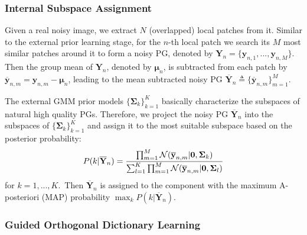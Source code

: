 \documentclass[10pt,twocolumn,letterpaper]{article}
\begin{document}
\vspace{-2mm}
\subsubsection{Internal Subspace Assignment}
\vspace{-1mm}

Given a real noisy image, we extract $N$ (overlapped) local patches from it. Similar to the external prior learning stage, for the $n$-th local patch we search its $M$ most similar patches around it to form a noisy PG, denoted by $\mathbf{Y}_{n} = \{\mathbf{y}_{n,1},...,\mathbf{y}_{n,M}\}$. Then the group mean of $\mathbf{Y}_{n}$, denoted by $\bm{\mu}_{n}$, is subtracted from each patch by $\mathbf{\overline{y}}_{n,m}=\mathbf{y}_{n,m}-\bm{\mu}_{n}$, leading to the mean subtracted noisy PG $\mathbf{\overline{Y}}_{n}\triangleq \{\mathbf{\overline{y}}_{n,m}\}_{m=1}^{M}$.

The external GMM prior models $\{\mathbf{\Sigma}_{k}\}_{k=1}^{K}$ basically characterize the subspaces of natural high quality PGs. Therefore, we project the noisy PG $\mathbf{\overline{Y}}_{n}$ into the subspaces of $\{\mathbf{\Sigma}_{k}\}_{k=1}^{K}$ and assign it to the most suitable subspace based on the posterior probability:
\vspace{-2mm}
\begin{equation}\label{equ3}\vspace{-2mm}
P(k|\mathbf{\overline{Y}}_{n})=\frac{\prod_{m=1}^{M}\mathcal{N}(\mathbf{\overline{y}}_{n,m}|\mathbf{0},\mathbf{\Sigma}_{k})}{\sum_{l=1}^{K}\prod_{m=1}^{M}\mathcal{N}(\mathbf{\overline{y}}_{n,m}|\mathbf{0},\mathbf{\Sigma}_{l})}
\end{equation}
for $k=1,...,K$.\ Then $\mathbf{\overline{Y}}_{n}$ is assigned to the component with the maximum A-posteriori (MAP) probability $\max_{k}P(k|\mathbf{\overline{Y}}_{n})$.

\vspace{-2mm}
\subsubsection{Guided Orthogonal Dictionary Learning}
\vspace{-2mm}
\end{document}
